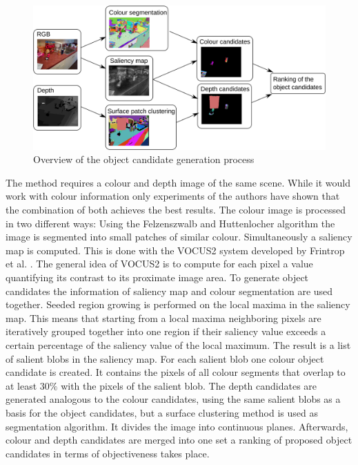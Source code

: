 \documentclass[a4paper,11pt,english]{article}
\begin{document}
\begin{figure}[h!]
	\begin{center}
		\includegraphics[width=1\textwidth]{src/saliency_object_detection.png}
		\caption{ Overview of the object candidate generation process \cite{garcia2015saliency}}
		\label{fig:2Dobject_discovery}
	\end{center}
\end{figure}

The method requires a colour and depth image of the same scene.
While it would work with colour information only experiments of the authors have shown that the combination of both achieves the best results.
The colour image is processed in two different ways: 
Using the Felzenszwalb and Huttenlocher algorithm \cite{felzenszwalb2004efficient} the image is segmented into small patches of similar colour.
Simultaneously a saliency map is computed. This is done with the VOCUS2 system developed by Frintrop et al. \cite{frintrop2015traditional}.
The general idea of VOCUS2 is to compute for each pixel a value quantifying its contrast to its proximate image area.
To generate object candidates the information of saliency map and colour segmentation are used together.
Seeded region growing is performed on the local maxima in the saliency map.
This means that starting from a local maxima neighboring pixels are iteratively grouped together into one region if their saliency value exceeds a certain percentage of the saliency value of the local maximum.
The result is a list of salient blobs in the saliency map.
For each salient blob one colour object candidate is created. It contains the pixels of all colour segments that overlap to at least $30\%$ with the pixels of the salient blob.
The depth candidates are generated analogous to the colour candidates, using the same salient blobs as a basis for the object candidates, but a surface clustering method is used as segmentation algorithm. It divides the image into continuous planes.
Afterwards, colour and depth candidates are merged into one set a ranking of proposed object candidates in terms of \glqq{}objectiveness\grqq{} takes place.
\end{document}
